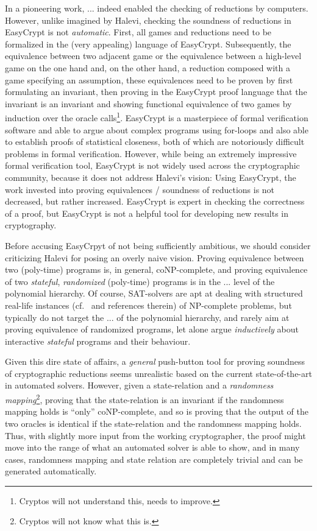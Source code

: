 In a pioneering work, ... indeed enabled the checking of reductions by computers. However, unlike imagined by Halevi, checking the soundness of reductions in EasyCrypt is not \emph{automatic}. First, all games and reductions need to be formalized in the (very appealing) language of EasyCrypt. Subsequently, the equivalence between two adjacent game or the equivalence between a high-level game on the one hand and, on the other hand, a reduction composed with a game specifying an assumption, these equivalences need to be proven by first formulating an invariant, then proving in the EasyCrypt proof language that the invariant is an invariant and showing functional equivalence of two games by induction over the oracle calls\footnote{Cryptos will not understand this, needs to improve.}. EasyCrypt is a masterpiece of formal verification software and able to argue about complex programs using for-loops and also able to establish proofs of statistical closeness, both of which are notoriously difficult problems in formal verification. However, while being an extremely impressive formal verification tool, EasyCrypt is not widely used across the cryptographic community, because it does not address Halevi's vision: Using EasyCrypt, the work invested into proving equivalences / soundness of reductions is not decreased, but rather increased. EasyCrypt is expert in checking the correctness of a proof, but EasyCrypt is not a helpful tool for developing new results in cryptography.

Before accusing EasyCrpyt of not being sufficiently ambitious, we should consider criticizing Halevi for posing an overly naive vision. Proving equivalence between two (poly-time) programs is, in general, coNP-complete, and proving equivalence of two \emph{stateful}, \emph{randomized} (poly-time) programs is in the ... level of the polynomial hierarchy. Of course, SAT-solvers are apt at dealing with structured real-life instances (cf.~\cite{X,Y,Z} and references therein) of NP-complete problems, but typically do not target the ... of the polynomial hierarchy, and rarely aim at proving equivalence of randomized programs, let alone argue \emph{inductively} about interactive \emph{stateful} programs and their behaviour.

Given this dire state of affairs, a \emph{general} push-button tool for proving soundness of cryptographic reductions seems unrealistic based on the current state-of-the-art in automated solvers. However, given a state-relation and a \emph{randomness mapping}\footnote{Cryptos will not know what this is.}, proving that the state-relation is an invariant if the randomness mapping holds is ``only'' coNP-complete, and so is proving that the output of the two oracles is identical if the state-relation and the randomness mapping holds. Thus, with slightly more input from the working cryptographer, the proof might move into the range of what an automated solver is able to show, and in many cases, randomness mapping and state relation are completely trivial and can be generated automatically.

